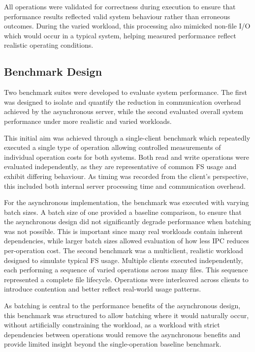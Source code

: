 All operations were validated for correctness during execution to ensure that performance results reflected valid system behaviour rather than erroneous outcomes. During the varied workload, this processing also mimicked non-file I/O which would occur in a typical system, helping measured performance reflect realistic operating conditions.

\subsection{Benchmark Design} 
 
Two benchmark suites were developed to evaluate system performance. The first was designed to isolate and quantify the reduction in communication overhead achieved by the asynchronous server, while the second evaluated overall system performance under more realistic and varied workloads.

This initial aim was achieved through a single-client benchmark which repeatedly executed a single type of operation allowing controlled measurements of individual operation costs for both systems. Both read and write operations were evaluated independently, as they are representative of common FS usage and exhibit differing behaviour. As timing was recorded from the client’s perspective, this included both internal server processing time and communication overhead.
 
For the asynchronous implementation, the benchmark was executed with varying batch sizes. A batch size of one provided a baseline comparison, to ensure that the asynchronous design did not significantly degrade performance when batching was not possible. This is important since many real workloads contain inherent dependencies, while larger batch sizes allowed evaluation of how less IPC reduces per-operation cost.
\newpage
The second benchmark was a multiclient, realistic workload designed to simulate typical FS usage. Multiple clients executed independently, each performing a sequence of varied operations across many files. This sequence represented a complete file lifecycle. Operations were interleaved across clients to introduce contention and better reflect real-world usage patterns.

As batching is central to the performance benefits of the asynchronous design, this benchmark was structured to allow batching where it would naturally occur, without artificially constraining the workload, as a workload with strict dependencies between operations would remove the asynchronous benefits and provide limited insight beyond the single-operation baseline benchmark. 

